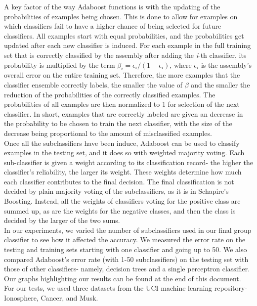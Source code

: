 \documentclass{article}
\begin{document}
A key factor of the way Adaboost functions is with the updating of the probabilities of examples being chosen. This is done to allow for examples on which classifiers fail to have a higher chance of being selected for future classifiers. All examples start with equal probabilities, and the probabilities get updated after each new classifier is induced. For each example in the full training set that is correctly classified by the assembly after adding the \textit{i}-th classifier, its probability is multiplied by the term $\beta_i = \epsilon_i / (1 - \epsilon_i)$, where $\epsilon_i$ is the assembly's overall error on the entire training set. Therefore, the more examples that the classifier ensemble correctly labels, the smaller the value of $\beta$ and the smaller the reduction of the probabilities of the correctly classified examples. The probabilities of all examples are then normalized to 1 for selection of the next classifier. In short, examples that are correctly labeled are given an decrease in the probability to be chosen to train the next classifier, with the size of the decrease being proportional to the amount of misclassified examples. \\

Once all the subclassifiers have been induce, Adaboost can be used to classify examples in the testing set, and it does so with weighted majority voting. Each sub-classifier is given a weight according to its classification record- the higher the classifier's reliability, the larger its weight. These weights determine how much each classifier contributes to the final decision. The final classification is not decided by plain majority voting of the subclassifiers, as it is in Schapire's Boosting. Instead, all the weights of classifiers voting for the positive class are summed up, as are the weights for the negative classes, and then the class is decided by the larger of the two sums. \\

In our experiments, we varied the number of subclassifiers used in our final group classifier to see how it affected the accuracy. We measured the error rate on the testing and training sets starting with one classifier and going up to 50. We also compared Adaboost's error rate (with 1-50 subclassifiers) on the testing set with those of other classifiers- namely, decision trees and a single perceptron classifier. Our graphs highlighting our results can be found at the end of this document. For our tests, we used three datasets from the UCI machine learning repository- Ionosphere, Cancer, and Musk.
\end{document}
